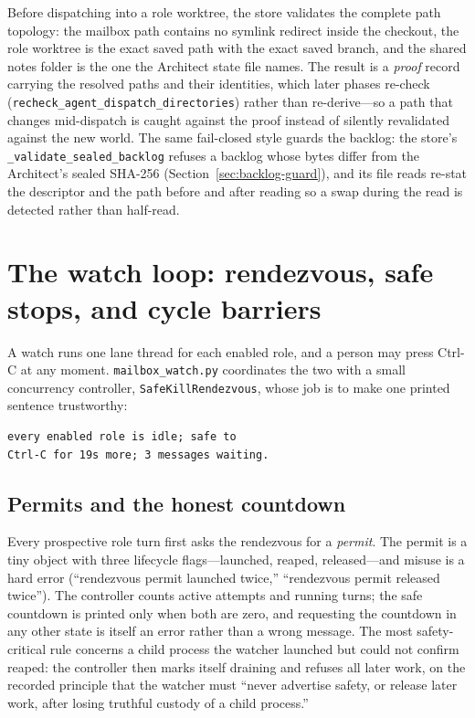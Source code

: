 \documentclass[10pt,aps,prd,twocolumn,nofootinbib]{revtex4-2}
\newcommand{\code}[1]{\texttt{#1}}
\newcommand{\file}[1]{\texttt{#1}}
\begin{document}
Before dispatching into a role worktree, the store validates the
complete path topology: the mailbox path contains no symlink
redirect inside the checkout, the role worktree is the exact saved
path with the exact saved branch, and the shared notes folder is the
one the Architect state file names.  The result is a \emph{proof}
record carrying the resolved paths and their identities, which
later phases re-check (\code{recheck\_agent\_dispatch\_directories})
rather than re-derive---so a path that changes mid-dispatch is caught
against the proof instead of silently revalidated against the new
world.  The same fail-closed style guards the backlog: the store's
\code{\_validate\_sealed\_backlog} refuses a backlog whose bytes
differ from the Architect's sealed SHA-256
(Section~\ref{sec:backlog-guard}), and its file reads re-stat the
descriptor and the path before and after reading so a swap during the
read is detected rather than half-read.

\section{The watch loop: rendezvous, safe stops, and cycle
barriers}
\label{sec:watch}

A watch runs one lane thread for each enabled role, and a person may
press Ctrl-C at any moment.  \file{mailbox\_watch.py} coordinates the
two with a small concurrency controller, \code{SafeKillRendezvous},
whose job is to make one printed sentence trustworthy:

\begin{verbatim}
every enabled role is idle; safe to
Ctrl-C for 19s more; 3 messages waiting.
\end{verbatim}

\subsection{Permits and the honest countdown}

Every prospective role turn first asks the rendezvous for a
\emph{permit}.  The permit is a tiny object with three lifecycle
flags---launched, reaped, released---and misuse is a hard error
(``rendezvous permit launched twice,'' ``rendezvous permit released
twice'').  The controller counts active attempts and running turns; the
safe countdown is printed only when both are zero, and requesting the
countdown in any other state is itself an error rather than a wrong
message.  The most safety-critical rule concerns a child process the
watcher launched but could not confirm reaped: the controller then
marks itself draining and refuses all later work, on the recorded
principle that the watcher must ``never advertise safety, or release
later work, after losing truthful custody of a child process.''
\end{document}
